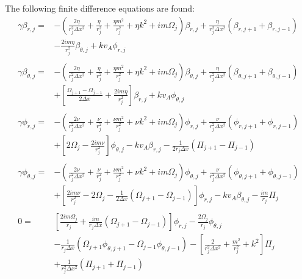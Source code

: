 \documentclass[letterpaper]{article}
\begin{document}
The following finite difference equations are found:
\begin{align}
\gamma\beta_{r, j} = &-(\frac{2\eta}{r_j^2 \Delta x^2} + \frac{\eta}{r_j^2}
 + \frac{\eta m^2}{r_j^2} + \eta k^2 + im\Omega_j )\beta_{r, j}
 + \frac{\eta}{r_j^2 \Delta x^2}(\beta_{r, j+1} + \beta_{r, j-1})
\nonumber \\
&- \frac{2im \eta}{r_j^2}\beta_{\theta,j} + k v_A \phi_{r,j}
\\
\nonumber \\
\gamma\beta_{\theta,j}=&-(\frac{2\eta}{r_j^2 \Delta x^2} 
 + \frac{\eta}{r_j^2} + \frac{\eta m^2}{r_j^2} 
 + \eta k^2 + im\Omega_j)\beta_{\theta, j}
 + \frac{\eta}{r_j^2 \Delta x^2}(\beta_{\theta, j+1} + \beta_{\theta, j-1})
\nonumber \\
&+\left[\frac{\Omega_{j+1}-\Omega_{j-1}}{2\Delta x}
 + \frac{2im\eta}{r_j^2}\right]\beta_{r,j} + kv_A\phi_{\theta,j}
\\
\nonumber \\
\gamma\phi_{r, j} = &-(\frac{2\nu}{r_j^2 \Delta x^2}
 + \frac{\nu}{r_j^2} + \frac{\nu m^2}{r_j^2} 
 + \nu k^2 + im\Omega_j)\phi_{r, j}
 + \frac{\nu}{r_j^2 \Delta x^2}(\phi_{r, j+1} + \phi_{r, j-1})
\nonumber \\
&+ \left[2\Omega_{j}-\frac{2im\nu}{r_j^2} \right]\phi_{\theta, j}
 - kv_A\beta_{r,j} - \frac{1}{2 r_j \Delta x}\left(\Pi_{j+1}-\Pi_{j-1}\right)
\\
\nonumber \\
\gamma\phi_{\theta, j} = &-(\frac{2\nu}{r_j^2 \Delta x^2} 
 + \frac{\nu}{r_j^2} + \frac{\nu m^2}{r_j^2} 
 + \nu k^2 + im\Omega_j)\phi_{\theta, j}
 + \frac{\nu}{r_j^2 \Delta x^2}(\phi_{\theta, j+1} + \phi_{\theta, j-1})
\nonumber \\
&+ \left[\frac{2im\nu}{r_j^2} - 2\Omega_j
 - \frac{1}{2\Delta x}\left(\Omega_{j+1}-\Omega_{j-1}\right)\right]\phi_{r,j}
 - kv_A \beta_{\theta, j} - \frac{im}{r_j}\Pi_{j}
\\
\nonumber \\
0 = &\left[\frac{2im\Omega_j}{r_j}
 + \frac{im}{r_j \Delta x}(\Omega_{j+1}-\Omega_{j-1})\right]\phi_{r,j}
 - \frac{2\Omega_j}{r_j}\phi_{\theta,j} 
\nonumber \\
&- \frac{1}{r_j \Delta x}\left(\Omega_{j+1}\phi_{\theta,j+1}
 -\Omega_{j-1}\phi_{\theta,j-1}\right)
 - \left[\frac{2}{r_j^2\Delta x^2} + \frac{m^2}{r_j^2}+k^2\right]\Pi_{j}
\nonumber \\
&+\frac{1}{r_j^2 \Delta x^2}\left(\Pi_{j+1} + \Pi_{j-1}\right)
\end{align}
\end{document}
